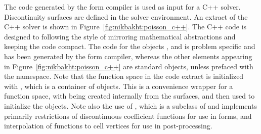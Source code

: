%
The code generated by the form compiler is used as input for a C++
solver. Discontinuity surfaces are defined in the solver environment.
An extract of the C++ solver is shown in
Figure~\ref{fig:nikbakht:poisson_c++}.  The C++ code is designed to
following the {\dolfin} style of mirroring mathematical abstractions
and keeping the code compact.  The code for the objects
,  and
 is problem specific and has been generated
by the form compiler, whereas the other elements appearing in
Figure~\ref{fig:nikbakht:poisson_c++} are standard {\dolfin} objects,
unless prefaced with the  namespace. Note that the function
space in the code extract is initialized with , which is
a container of  objects. This is a convenience
wrapper for a \ufc{} function space, with  being
created internally from the surfaces, and then used to initialize the
\ufc{} objects.  Note also the use of , which is a
subclass of  and implements primarily
restrictions of discontinuous coefficient functions for use in forms,
and interpolation of functions to cell vertices for use in
post-processing.

